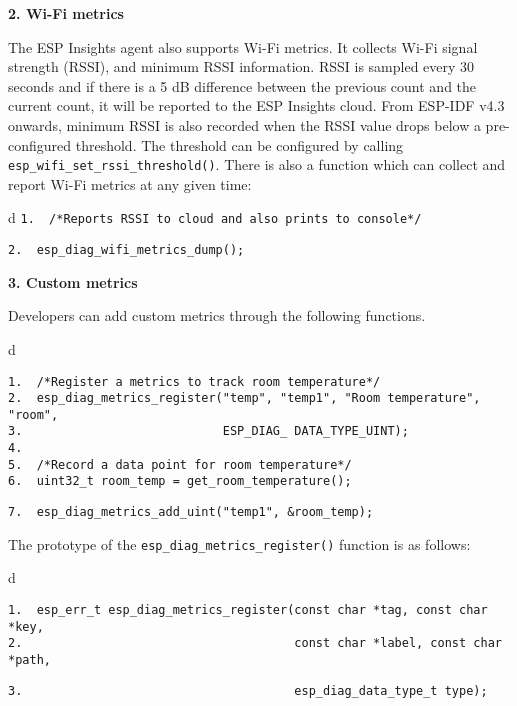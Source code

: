 \documentclass[a4paper,12pt]{book}
\begin{document}
\textbf{2. Wi-Fi metrics}

The ESP Insights agent also supports Wi-Fi metrics. It collects Wi-Fi signal strength (RSSI), and minimum RSSI information. RSSI is sampled every 30 seconds and if there is a 5 dB difference between the previous count and the current count, it will be reported to the ESP Insights cloud. From ESP-IDF v4.3 onwards, minimum RSSI is also recorded when the RSSI value drops below a pre-configured threshold. The threshold can be configured by calling \verb|esp_wifi_set_rssi_threshold()|. There is also a function which can collect and report Wi-Fi metrics at any given time:

\begin{codebloc}
\begin{tabular}{d}
\verb|1.  /*Reports RSSI to cloud and also prints to console*/|

\verb|2.  esp_diag_wifi_metrics_dump();|
\end{tabular}
\end{codebloc}

\textbf{3. Custom metrics}

Developers can add custom metrics through the following functions.

\begin{codebloc}
\begin{tabular}{d}
\vspace{2pt}
\begin{verbatim}
1.  /*Register a metrics to track room temperature*/
2.  esp_diag_metrics_register("temp", "temp1", "Room temperature", "room",
3.                            ESP_DIAG_ DATA_TYPE_UINT);
4.
5.  /*Record a data point for room temperature*/
6.  uint32_t room_temp = get_room_temperature();
\end{verbatim}
\verb|7.  esp_diag_metrics_add_uint("temp1", &room_temp);|
\end{tabular}
\end{codebloc}

The prototype of the \verb|esp_diag_metrics_register()| function is as follows:

\begin{codebloc}
\begin{tabular}{d}
\vspace{2pt}
\begin{verbatim}
1.  esp_err_t esp_diag_metrics_register(const char *tag, const char *key,
2.                                      const char *label, const char *path,
\end{verbatim}
\verb|3.                                      esp_diag_data_type_t type);|
\end{tabular}
\end{codebloc}
\end{document}
